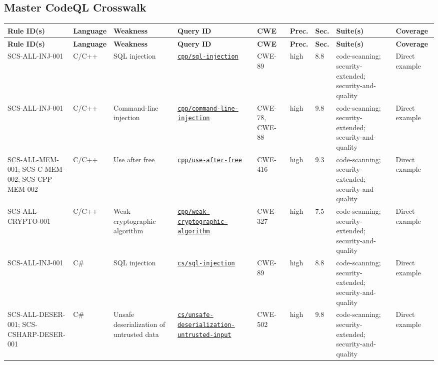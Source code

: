 \documentclass[10pt,letterpaper]{article}
\newcommand{\code}[1]{\begingroup\small\ttfamily\def\UrlFont{\ttfamily}\nolinkurl{#1}\endgroup}
\begin{document}
\begin{landscape}
\section{Master CodeQL Crosswalk}
\scriptsize
\setlength{\tabcolsep}{2.5pt}
\begin{longtable}{@{}P{0.95in}P{0.85in}P{1.2in}P{1.55in}P{0.75in}P{0.45in}P{0.45in}P{1.5in}P{0.7in}@{}}
\toprule
\textbf{Rule ID(s)} & \textbf{Language} & \textbf{Weakness} & \textbf{Query ID} & \textbf{CWE} & \textbf{Prec.} & \textbf{Sec.} & \textbf{Suite(s)} & \textbf{Coverage}\\
\midrule
\endfirsthead
\toprule
\textbf{Rule ID(s)} & \textbf{Language} & \textbf{Weakness} & \textbf{Query ID} & \textbf{CWE} & \textbf{Prec.} & \textbf{Sec.} & \textbf{Suite(s)} & \textbf{Coverage}\\
\midrule
\endhead
SCS-ALL-INJ-001 & C/C++ & SQL injection & \href{https://codeql.github.com/codeql-query-help/cpp/cpp-sql-injection/}{\code{cpp/sql-injection}} & CWE-89 & high & 8.8 & code-scanning; security-extended; security-and-quality & Direct example\\
SCS-ALL-INJ-001 & C/C++ & Command-line injection & \href{https://codeql.github.com/codeql-query-help/cpp/cpp-command-line-injection/}{\code{cpp/command-line-injection}} & CWE-78, CWE-88 & high & 9.8 & code-scanning; security-extended; security-and-quality & Direct example\\
SCS-ALL-MEM-001; SCS-C-MEM-002; SCS-CPP-MEM-002 & C/C++ & Use after free & \href{https://codeql.github.com/codeql-query-help/cpp/cpp-use-after-free/}{\code{cpp/use-after-free}} & CWE-416 & high & 9.3 & code-scanning; security-extended; security-and-quality & Direct example\\
SCS-ALL-CRYPTO-001 & C/C++ & Weak cryptographic algorithm & \href{https://codeql.github.com/codeql-query-help/cpp/cpp-weak-cryptographic-algorithm/}{\code{cpp/weak-cryptographic-algorithm}} & CWE-327 & high & 7.5 & code-scanning; security-extended; security-and-quality & Direct example\\
SCS-ALL-INJ-001 & C\# & SQL injection & \href{https://codeql.github.com/codeql-query-help/csharp/cs-sql-injection/}{\code{cs/sql-injection}} & CWE-89 & high & 8.8 & code-scanning; security-extended; security-and-quality & Direct example\\
SCS-ALL-DESER-001; SCS-CSHARP-DESER-001 & C\# & Unsafe deserialization of untrusted data & \href{https://codeql.github.com/codeql-query-help/csharp/cs-unsafe-deserialization-untrusted-input/}{\code{cs/unsafe-deserialization-untrusted-input}} & CWE-502 & high & 9.8 & code-scanning; security-extended; security-and-quality & Direct example\\

\end{longtable}
\end{landscape}
\end{document}
